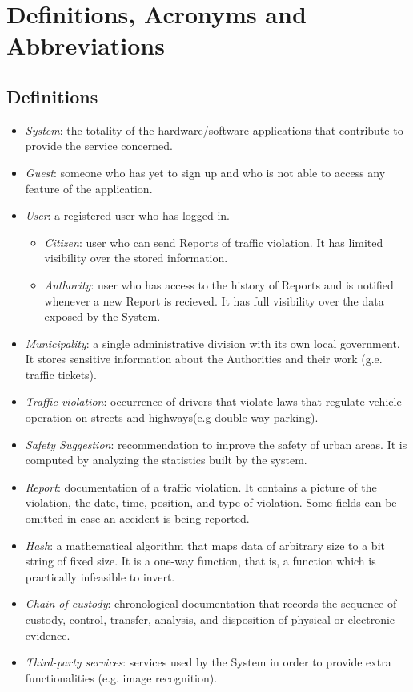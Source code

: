 \documentclass{report}
\begin{document}
\section{Definitions, Acronyms and Abbreviations}
\subsection{Definitions}
\begin{itemize}
	\item \textit{System}: the totality of the hardware/software applications that contribute to provide the service concerned.
    \item \textit{Guest}: someone who has yet to sign up and who is not able to access any feature of the application.
    \item \textit{User}: a registered user who has logged in.
	\begin{itemize}
		\item \textit{Citizen}: user who can send Reports of traffic violation. It has limited visibility over the stored information.
		\item \textit{Authority}: user who has access to the history of Reports and is notified whenever a new Report is recieved. It has full visibility over the data exposed by the System.
	\end{itemize} 
	\item \textit{Municipality}: a single administrative division with its own local government. It stores sensitive information about the Authorities and their work (g.e. traffic tickets).
    \item \textit{Traffic violation}: occurrence of drivers that violate laws that regulate vehicle operation on streets and highways(e.g double-way parking).
    \item \textit{Safety Suggestion}: recommendation to improve the safety of urban areas. It is computed by analyzing the statistics built by the system.
    \item \textit{Report}: documentation of a traffic violation. It contains a picture of the violation, the date, time, position, and type of violation. Some fields can be omitted in case an accident is being reported.
    \item \textit{Hash}: a mathematical algorithm that maps data of arbitrary size to a bit string of fixed size. It is a one-way function, that is, a function which is practically infeasible to invert.
    \item \textit{Chain of custody}: chronological documentation that records the sequence of custody, control, transfer, analysis, and disposition of physical or electronic evidence.
    \item \textit{Third-party services}: services used by the System in order to provide extra functionalities (e.g. image recognition).
\end{itemize}
\end{document}
